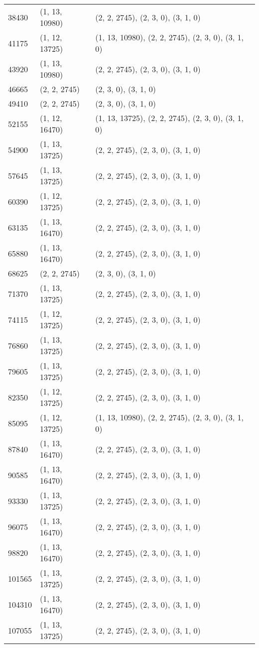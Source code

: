 \begin{longtable}[h!t!]{p{0.6in}p{1in}p{4.4in}}
38430 & (1, 13, 10980) & (2, 2, 2745), (2, 3, 0), (3, 1, 0) \\
41175 & (1, 12, 13725) & (1, 13, 10980), (2, 2, 2745), (2, 3, 0), (3, 1, 0) \\
43920 & (1, 13, 10980) & (2, 2, 2745), (2, 3, 0), (3, 1, 0) \\
46665 & (2, 2, 2745) & (2, 3, 0), (3, 1, 0) \\
49410 & (2, 2, 2745) & (2, 3, 0), (3, 1, 0) \\
52155 & (1, 12, 16470) & (1, 13, 13725), (2, 2, 2745), (2, 3, 0), (3, 1, 0) \\
54900 & (1, 13, 13725) & (2, 2, 2745), (2, 3, 0), (3, 1, 0) \\
57645 & (1, 13, 13725) & (2, 2, 2745), (2, 3, 0), (3, 1, 0) \\
60390 & (1, 12, 13725) & (2, 2, 2745), (2, 3, 0), (3, 1, 0) \\
63135 & (1, 13, 16470) & (2, 2, 2745), (2, 3, 0), (3, 1, 0) \\
65880 & (1, 13, 16470) & (2, 2, 2745), (2, 3, 0), (3, 1, 0) \\
68625 & (2, 2, 2745) & (2, 3, 0), (3, 1, 0) \\
71370 & (1, 13, 13725) & (2, 2, 2745), (2, 3, 0), (3, 1, 0) \\
74115 & (1, 12, 13725) & (2, 2, 2745), (2, 3, 0), (3, 1, 0) \\
76860 & (1, 13, 13725) & (2, 2, 2745), (2, 3, 0), (3, 1, 0) \\
79605 & (1, 13, 13725) & (2, 2, 2745), (2, 3, 0), (3, 1, 0) \\
82350 & (1, 12, 13725) & (2, 2, 2745), (2, 3, 0), (3, 1, 0) \\
85095 & (1, 12, 13725) & (1, 13, 10980), (2, 2, 2745), (2, 3, 0), (3, 1, 0) \\
87840 & (1, 13, 16470) & (2, 2, 2745), (2, 3, 0), (3, 1, 0) \\
90585 & (1, 13, 16470) & (2, 2, 2745), (2, 3, 0), (3, 1, 0) \\
93330 & (1, 13, 13725) & (2, 2, 2745), (2, 3, 0), (3, 1, 0) \\
96075 & (1, 13, 16470) & (2, 2, 2745), (2, 3, 0), (3, 1, 0) \\
98820 & (1, 13, 16470) & (2, 2, 2745), (2, 3, 0), (3, 1, 0) \\
101565 & (1, 13, 13725) & (2, 2, 2745), (2, 3, 0), (3, 1, 0) \\
104310 & (1, 13, 16470) & (2, 2, 2745), (2, 3, 0), (3, 1, 0) \\
107055 & (1, 13, 13725) & (2, 2, 2745), (2, 3, 0), (3, 1, 0) \\

\end{longtable}
